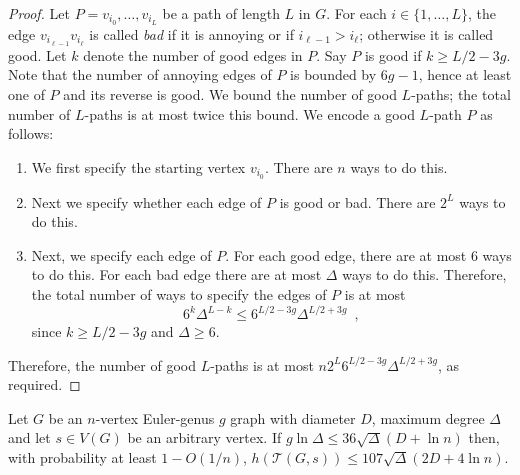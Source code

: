 \documentclass{patmorin}
\newcommand{\tcal}{\mathcal{T}}
\begin{document}
\begin{proof}
   Let $P=v_{i_0},\ldots,v_{i_L}$ be a path of length $L$ in $G$.
   For each $i\in\{1,\ldots,L\}$, the edge $v_{i_{\ell-1}}v_{i_{\ell}}$
   is called \emph{bad} if it is annoying or if $i_{\ell-1}>i_{\ell}$; otherwise it is called good. 
   Let $k$ denote the number of good edges in $P$.
   Say $P$ is good if $k \geq L/2-3g$.
   Note that the number of annoying edges of $P$ is bounded by $6g-1$, 
hence at least one of $P$ and its reverse is good.
We bound the number of good $L$-paths; the total number of $L$-paths is at most twice this bound.
We encode a good $L$-path $P$ as follows:
   \begin{enumerate}
     \item We first specify the starting vertex $v_{i_0}$.  There are $n$
       ways to do this.
     \item Next we specify whether each edge of $P$ is good or bad.
       There are $2^L$ ways to do this.
     \item Next, we specify each edge of $P$.  For each good edge,
       there are at most 6 ways to do this. For each bad edge there are 
       at most $\Delta$ ways to do this.
      Therefore, the total number of ways to specify the edges of $P$ is at most
      \[   6^k\Delta^{L-k} \le 6^{L/2-3g}\Delta^{L/2+3g}  \enspace ,\]
      since $k\ge L/2-3g$ and $\Delta\ge 6$.
   \end{enumerate}
   Therefore, the  number of good $L$-paths 
    is at most $n2^L6^{L/2-3g}\Delta^{L/2+3g}$, as required.
%
%
\end{proof}


\begin{thm}
  Let $G$ be an $n$-vertex Euler-genus $g$ graph with diameter $D$,
  maximum degree $\Delta$ and let $s\in V(G)$ be an arbitrary vertex.
  If $g\ln\Delta \le 36\sqrt{\Delta}(D+\ln n)$ then,
  with probability at least $1-O(1/n)$,
  $h(\tcal(G,s))\le 107\sqrt{\Delta}(2D+4\ln n)$.
\end{thm}
\end{document}
